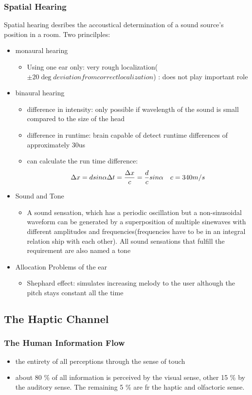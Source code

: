 \documentclass{standalone}
\begin{document}
\subsubsection{Spatial Hearing}
Spatial hearing desribes the accoustical determination of a sound source's position in a room. Two princilples:
\begin{itemize}
	\item monaural hearing
	\begin{itemize}
		\item Using one ear only: very rough localization($\pm 20 \deg deviation from correct localization$) : does not play important role
	\end{itemize}
	\item binaural hearing
	\begin{itemize}
		\item difference in intensity: only possible if wavelength of the sound is small compared to the size of the head
		\item difference in runtime: brain capable of detect runtime differences of approximately 30us
		\item can calculate the run time difference:
		$$
		\Delta x = d sin \alpha \\
		\Delta t = \frac{\Delta x}{c} = \frac{d}{c} sin \alpha \quad c = 340m/s
		$$
	\end{itemize}
	\item Sound and Tone
		\begin{itemize}
			\item A sound sensation, which has a periodic oscillation but a non-sinusoidal waveform can be generated by a superposition of multiple sinewaves with different amplitudes and frequencies(frequencies have to be in an integral relation ship with each other). All sound sensations that fulfill the requirement are also named a tone
		\end{itemize}
	\item Allocation Problems of the ear
			\begin{itemize}
			\item Shephard effect: simulates increasing melody to the user although the pitch stays constant all the time
		\end{itemize}
\end{itemize}
\subsection{The Haptic Channel}
\subsubsection{The Human Information Flow}
\begin{itemize}
	\item the entirety of all perceptions through the sense of touch
	\item about 80 \% of all information is perceived by the visual sense, other 15 \% by the auditory sense. The remaining 5 \% are fr the haptic and olfactoric sense. 
\end{itemize}
\end{document}
